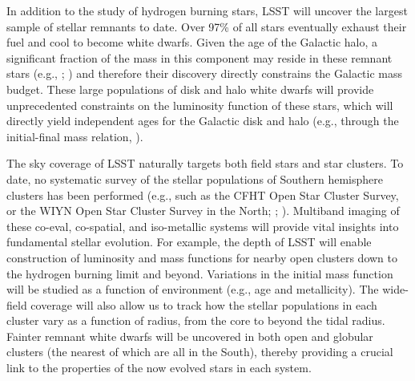 
In addition to the study of hydrogen burning stars, LSST will uncover the largest sample of stellar remnants to date.
Over 97\% of all stars eventually exhaust their fuel and cool to become white dwarfs. Given the age of the Galactic
halo, a significant fraction of the mass in this component may reside in these remnant stars (e.g., \cite{Alcock2000};
\cite{Tisserand2007}) and therefore their discovery directly constrains the Galactic mass budget.  These large
populations of disk and halo white dwarfs will provide unprecedented constraints on the luminosity function of
these stars, which will directly yield independent ages for the Galactic disk and halo (e.g., through the initial-final mass
relation, \cite{Kalirai2008}).

The sky coverage of LSST naturally targets both field stars and star clusters.  To date, no systematic survey of the stellar
populations of Southern hemisphere clusters has been performed (e.g., such as the CFHT Open Star Cluster Survey, or
the WIYN Open Star Cluster Survey in the North; \cite{Kalirai2001}; \cite{Mathieu2000}).  Multiband imaging of these co-eval,
co-spatial, and iso-metallic systems will provide vital insights into fundamental stellar evolution.  For example, the depth
of LSST will enable construction of  luminosity and mass functions for nearby open clusters down to the hydrogen burning
limit and beyond.  Variations in the initial mass function will be studied as a function of environment (e.g., age and metallicity).
The wide-field coverage will also allow us to track how the stellar populations in each cluster vary as a function of radius,
from the core to beyond the tidal radius. Fainter remnant white dwarfs will be uncovered in both open and globular clusters
(the nearest of which are all in the South), thereby providing a crucial link to the properties of the now evolved stars in each
system.



